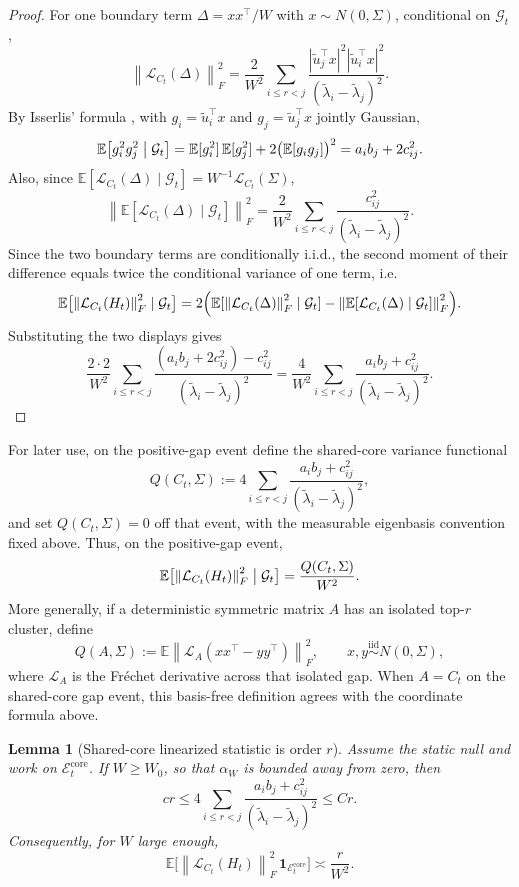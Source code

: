 \documentclass[11pt]{article}
\theoremstyle{tightplain}
\newtheorem{lemma}[theorem]{Lemma}
\theoremstyle{tightdef}
\newcommand{\E}{\mathbb E}
\newcommand{\norm}[1]{\left\lVert #1 \right\rVert}
\newcommand{\abs}[1]{\left\lvert #1 \right\rvert}
\newcommand{\one}{\mathbf 1}
\begin{document}
\begin{proof}
For one boundary term $\Delta=xx^\top/W$ with $x\sim N(0,\Sigma)$, conditional
on $\mathcal G_t$,
\[
\norm{\mathcal L_{C_t}(\Delta)}_F^2
=\frac2{W^2}
\sum_{i\le r<j}
\frac{\abs{\widetilde u_j^\top x}^2\abs{\widetilde u_i^\top x}^2}
{(\widetilde\lambda_i-\widetilde\lambda_j)^2}.
\]
By Isserlis' formula \cite{Isserlis1918}, with $g_i=\widetilde u_i^\top x$ and
$g_j=\widetilde u_j^\top x$ jointly Gaussian,
\[
\E\bigl[g_i^2 g_j^2\bigm|\mathcal G_t\bigr]
=\E[g_i^2]\,\E[g_j^2]+2\bigl(\E[g_i g_j]\bigr)^2
=a_i b_j+2c_{ij}^2.
\]
Also, since $\E[\mathcal L_{C_t}(\Delta)\mid\mathcal G_t]=W^{-1}\mathcal L_{C_t}(\Sigma)$,
\[
\norm{\E[\mathcal L_{C_t}(\Delta)\mid\mathcal G_t]}_F^2
=\frac2{W^2}
\sum_{i\le r<j}
\frac{c_{ij}^2}{(\widetilde\lambda_i-\widetilde\lambda_j)^2}.
\]
Since the two boundary terms are conditionally i.i.d., the second moment of
their difference equals twice the conditional variance of one term, i.e.
\[
\E\bigl[\norm{\mathcal L_{C_t}(H_t)}_F^2\mid\mathcal G_t\bigr]
=2\Bigl(
\E[\norm{\mathcal L_{C_t}(\Delta)}_F^2\mid\mathcal G_t]
-
\norm{\E[\mathcal L_{C_t}(\Delta)\mid\mathcal G_t]}_F^2
\Bigr).
\]
Substituting the two displays gives
\[
\frac{2\cdot2}{W^2}\sum_{i\le r<j}\frac{(a_i b_j+2c_{ij}^2)-c_{ij}^2}{(\widetilde\lambda_i-\widetilde\lambda_j)^2}
=\frac4{W^2}\sum_{i\le r<j}\frac{a_i b_j+c_{ij}^2}{(\widetilde\lambda_i-\widetilde\lambda_j)^2}.
\]
\end{proof}

For later use, on the positive-gap event define the shared-core variance
functional
\[
Q(C_t,\Sigma)
:=4\sum_{i\le r<j}
\frac{a_i b_j+c_{ij}^2}{(\widetilde\lambda_i-\widetilde\lambda_j)^2},
\]
and set $Q(C_t,\Sigma)=0$ off that event, with the measurable eigenbasis
convention fixed above. Thus, on the positive-gap event,
\[
\E\bigl[\norm{\mathcal L_{C_t}(H_t)}_F^2\bigm|\mathcal G_t\bigr]
=\frac{Q(C_t,\Sigma)}{W^2}.
\]
More generally, if a deterministic symmetric matrix $A$ has an isolated top-$r$
cluster, define
\[
Q(A,\Sigma):=\E\norm{\mathcal L_A(xx^\top-yy^\top)}_F^2,
\qquad
x,y\stackrel{\mathrm{iid}}{\sim}N(0,\Sigma),
\]
where $\mathcal L_A$ is the Fr\'echet derivative across that isolated gap. When
$A=C_t$ on the shared-core gap event, this basis-free definition agrees with the
coordinate formula above.

\begin{lemma}[Shared-core linearized statistic is order $r$]\label{lem:sharedcorelinearized}
Assume the static null and work on $\mathcal E_t^{\mathrm{core}}$. If
$W\ge W_0$, so that $\alpha_W$ is bounded away from zero, then
\[
c r
\le
4\sum_{i\le r<j}
\frac{a_i b_j+c_{ij}^2}{(\widetilde\lambda_i-\widetilde\lambda_j)^2}
\le
C r.
\]
Consequently, for $W$ large enough,
\[
\E\bigl[
\norm{\mathcal L_{C_t}(H_t)}_F^2
\,\one_{\mathcal E_t^{\mathrm{core}}}
\bigr]
\asymp
\frac r{W^2}.
\]
\end{lemma}
\end{document}
